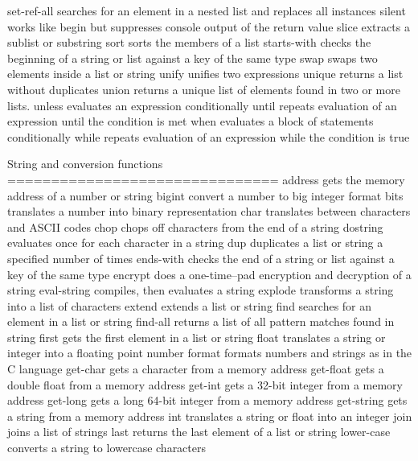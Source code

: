\documentclass[cn,11pt]{elegantbook}
\begin{document}
\begin{itemize}
set-ref-all       searches for an element in a nested list and replaces all instances
silent            works like begin but suppresses console output of the return value
slice             extracts a sublist or substring
sort              sorts the members of a list
starts-with       checks the beginning of a string or list against a key of the same type
swap              swaps two elements inside a list or string
unify             unifies two expressions
unique            returns a list without duplicates
union             returns a unique list of elements found in two or more lists.
unless            evaluates an expression conditionally
until             repeats evaluation of an expression until the condition is met
when              evaluates a block of statements conditionally
while             repeats evaluation of an expression while the condition is true
\end{itemize}
String and conversion functions
===============================
address           gets the memory address of a number or string
bigint            convert a number to big integer format
bits              translates a number into binary representation
char              translates between characters and ASCII codes
chop              chops off characters from the end of a string
dostring          evaluates once for each character in a string
dup               duplicates a list or string a specified number of times
ends-with         checks the end of a string or list against a key of the same type
encrypt           does a one-time–pad encryption and decryption of a string
eval-string       compiles, then evaluates a string
explode           transforms a string into a list of characters
extend            extends a list or string
find              searches for an element in a list or string
find-all          returns a list of all pattern matches found in string
first             gets the first element in a list or string
float             translates a string or integer into a floating point number
format            formats numbers and strings as in the C language
get-char          gets a character from a memory address
get-float         gets a double float from a memory address
get-int           gets a 32-bit integer from a memory address
get-long          gets a long 64-bit integer from a memory address
get-string        gets a string from a memory address
int               translates a string or float into an integer
join              joins a list of strings
last              returns the last element of a list or string
lower-case        converts a string to lowercase characters
\end{document}
